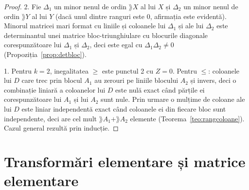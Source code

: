 \begin{proof}
2. Fie $\Delta_1$ un minor nenul de ordin $\rang X$ al lui $X$ și $\Delta_2$ un minor nenul de ordin $\rang Y$ al lui $Y$ (dacă unul dintre ranguri este $0$, afirmația este evidentă). Minorul matricei mari format cu liniile și coloanele lui $\Delta_1$ și ale lui $\Delta_2$ este determinantul unei matrice bloc-triunghiulare cu blocurile diagonale corespunzătoare lui $\Delta_1$ și $\Delta_2$, deci este egal cu $\Delta_1\Delta_2\neq0$ (Propoziția~\ref{prop:detbloc}).

1. Pentru $k=2$, inegalitatea $\ge$ este punctul 2 cu $Z=0$. Pentru $\le$: coloanele lui $D$ care trec prin blocul $A_1$ au zerouri pe liniile blocului $A_2$ și invers, deci o combinație liniară a coloanelor lui $D$ este nulă exact când părțile ei corespunzătoare lui $A_1$ și lui $A_2$ sunt nule. Prin urmare o mulțime de coloane ale lui $D$ este liniar independentă exact când coloanele ei din fiecare bloc sunt independente, deci are cel mult $\rang A_1+\rang A_2$ elemente (Teorema~\ref{teo:rangcoloane}). Cazul general rezultă prin inducție.
\end{proof}

\section{Transformări elementare și matrice elementare}

